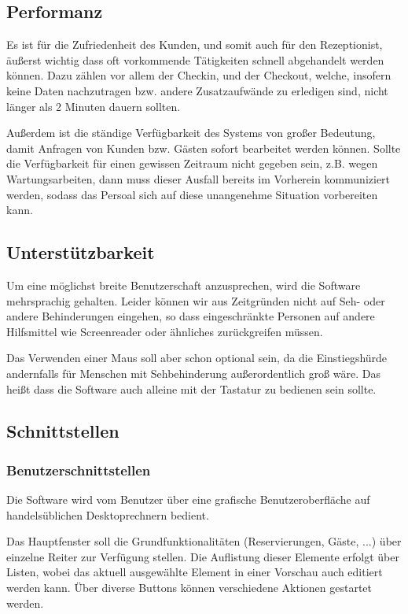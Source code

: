 \documentclass[10pt,a4paper,titlepage]{article}
\begin{document}
\subsection{Performanz}
Es ist für die Zufriedenheit des Kunden, und somit auch für den \Gls{Rezeptionist}, äußerst wichtig dass oft vorkommende Tätigkeiten schnell abgehandelt werden können. Dazu zählen vor allem der \Gls{Checkin}, und der \Gls{Checkout}, welche, insofern keine Daten nachzutragen bzw. andere Zusatzaufwände zu erledigen sind, nicht länger als 2 Minuten dauern sollten.

Außerdem ist die ständige Verfügbarkeit des Systems von großer Bedeutung, damit Anfragen von Kunden bzw. Gästen sofort bearbeitet werden können. Sollte die Verfügbarkeit für einen gewissen Zeitraum nicht gegeben sein, z.B. wegen Wartungsarbeiten, dann muss dieser Ausfall bereits im Vorherein kommuniziert werden, sodass das Persoal sich auf diese unangenehme Situation vorbereiten kann.
\subsection{Unterstützbarkeit}
Um eine möglichst breite Benutzerschaft anzusprechen, wird die Software mehrsprachig gehalten. Leider können wir aus Zeitgründen nicht auf Seh- oder andere Behinderungen eingehen, so dass eingeschränkte Personen auf andere Hilfsmittel wie Screenreader oder ähnliches zurückgreifen müssen.

Das Verwenden einer Maus soll aber schon optional sein, da die Einstiegshürde andernfalls für Menschen mit Sehbehinderung außerordentlich groß wäre. Das heißt dass die Software auch alleine mit der Tastatur zu bedienen sein sollte.
\subsection{Schnittstellen}
\subsubsection{Benutzerschnittstellen}
Die Software wird vom Benutzer über eine grafische Benutzeroberfläche auf handelsüblichen Desktoprechnern bedient.

Das Hauptfenster soll die Grundfunktionalitäten (Reservierungen, Gäste, ...) über einzelne Reiter zur Verfügung stellen. Die Auflistung dieser Elemente erfolgt über Listen, wobei das aktuell ausgewählte Element in einer Vorschau auch editiert werden kann. Über diverse Buttons können verschiedene Aktionen gestartet werden.
\end{document}
